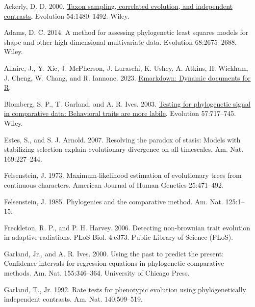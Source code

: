 \documentclass[fleqn,10pt,lineno]{wlpeerj} %
\newlength{\cslhangindent}
\newenvironment{CSLReferences}[2] %
 {\begin{list}{}{%
  \setlength{\itemindent}{0pt}
  \setlength{\leftmargin}{0pt}
  \setlength{\parsep}{0pt}
  \ifodd #1
   \setlength{\leftmargin}{\cslhangindent}
   \setlength{\itemindent}{-1\cslhangindent}
  \fi
  \setlength{\itemsep}{#2\baselineskip}}}
 {\end{list}}
\begin{document}
\label{refs}
\begin{CSLReferences}{1}{0}
Ackerly, D. D. 2000. \href{https://doi.org/10.1111/j.0014-3820.2000.tb00694.x}{Taxon sampling, correlated evolution, and independent contrasts}. Evolution 54:1480--1492. Wiley.

Adams, D. C. 2014. A method for assessing phylogenetic least squares models for shape and other high-dimensional multivariate data. Evolution 68:2675--2688. Wiley.

Allaire, J., Y. Xie, J. McPherson, J. Luraschi, K. Ushey, A. Atkins, H. Wickham, J. Cheng, W. Chang, and R. Iannone. 2023. \href{https://github.com/rstudio/rmarkdown}{{R}markdown: Dynamic documents for {R}}.

Blomberg, S. P., T. Garland, and A. R. Ives. 2003. \href{https://doi.org/10.1111/j.0014-3820.2003.tb00285.x}{Testing for phylogenetic signal in comparative data: Behavioral traits are more labile}. Evolution 57:717--745. Wiley.

Estes, S., and S. J. Arnold. 2007. Resolving the paradox of stasis: Models with stabilizing selection explain evolutionary divergence on all timescales. Am. Nat. 169:227--244.

Felsenstein, J. 1973. Maximum-likelihood estimation of evolutionary trees from continuous characters. American Journal of Human Genetics 25:471--492.

Felsenstein, J. 1985. Phylogenies and the comparative method. Am. Nat. 125:1--15.

Freckleton, R. P., and P. H. Harvey. 2006. Detecting non-brownian trait evolution in adaptive radiations. PLoS Biol. 4:e373. Public Library of Science (PLoS).

Garland, Jr., and A. R. Ives. 2000. Using the past to predict the present: Confidence intervals for regression equations in phylogenetic comparative methods. Am. Nat. 155:346--364. University of Chicago Press.

Garland, T., Jr. 1992. Rate tests for phenotypic evolution using phylogenetically independent contrasts. Am. Nat. 140:509--519.


\end{CSLReferences}
\end{document}
